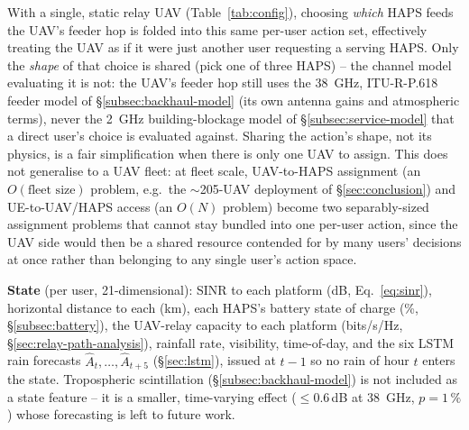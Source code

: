 \documentclass[]{ieeeaccess}
\begin{document}
With a single, static relay UAV (Table~\ref{tab:config}), choosing \emph{which} HAPS feeds the UAV's feeder hop is folded into this same per-user action set, effectively treating the UAV as if it were just another user requesting a serving HAPS. Only the \emph{shape} of that choice is shared (pick one of three HAPS) -- the channel model evaluating it is not: the UAV's feeder hop still uses the 38~GHz, ITU-R-P.618 feeder model of \S\ref{subsec:backhaul-model} (its own antenna gains and atmospheric terms), never the 2~GHz building-blockage model of \S\ref{subsec:service-model} that a direct user's choice is evaluated against. Sharing the action's shape, not its physics, is a fair simplification when there is only one UAV to assign. This does not generalise to a UAV fleet: at fleet scale, UAV-to-HAPS assignment (an $O(\text{fleet size})$ problem, e.g.\ the $\sim$205-UAV deployment of \S\ref{sec:conclusion}) and UE-to-UAV/HAPS access (an $O(N)$ problem) become two separably-sized assignment problems that cannot stay bundled into one per-user action, since the UAV side would then be a shared resource contended for by many users' decisions at once rather than belonging to any single user's action space.

\textbf{State} (per user, 21-dimensional): SINR to each platform (dB, Eq.~\eqref{eq:sinr}), horizontal distance to each (km), each HAPS's battery state of charge (\%, \S\ref{subsec:battery}), the UAV-relay capacity to each platform (bits/s/Hz, \S\ref{sec:relay-path-analysis}), rainfall rate, visibility, time-of-day, and the six LSTM rain forecasts $\hat{A}_t,\dots,\hat{A}_{t+5}$ (\S\ref{sec:lstm}), issued at $t-1$ so no rain of hour $t$ enters the state. Tropospheric scintillation (\S\ref{subsec:backhaul-model}) is not included as a state feature -- it is a smaller, time-varying effect ($\le$0.6\,dB at 38~GHz, $p=1\,\%$) whose forecasting is left to future work.
\end{document}
